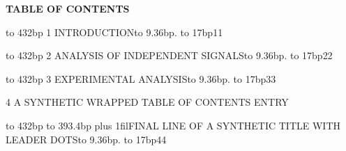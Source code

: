 \documentclass[12pt]{article}
\newcommand{\tocrow}[2]{%
  \noindent\hbox to 432bp{%
    #1\leaders\hbox to 9.36bp{\hfil.\hfil}\hfill
    \hbox to 17bp{\hfil#2}}\par}
\begin{document}
\begin{center}\textbf{TABLE OF CONTENTS}\end{center}
\vspace{12bp}
\tocrow{1 INTRODUCTION}{11}
\vspace{10bp}
\tocrow{2 ANALYSIS OF INDEPENDENT SIGNALS}{22}
\vspace{10bp}
\tocrow{3 EXPERIMENTAL ANALYSIS}{33}
\vspace{10bp}
4 A SYNTHETIC WRAPPED TABLE OF CONTENTS ENTRY\par
\tocrow{\hbox to 393.4bp{\hskip18bp\spaceskip=3bp plus 1fil\relax FINAL LINE OF A SYNTHETIC TITLE WITH LEADER DOTS}}{44}
\end{document}
